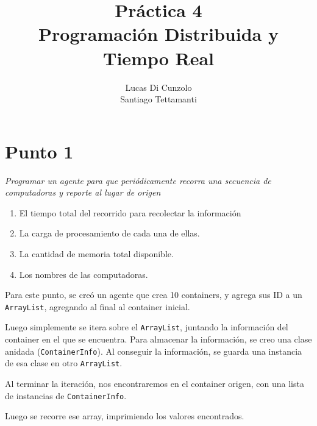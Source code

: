 \documentclass[12pt,journal,compsoc]{IEEEtran}
\begin{document}
\title{Práctica 4\\Programación Distribuida y Tiempo Real}
\author{Lucas Di Cunzolo\\Santiago Tettamanti}


\maketitle

\IEEEdisplaynontitleabstractindextext
\IEEEpeerreviewmaketitle

\section{Punto 1}

\textit{Programar un agente para que periódicamente recorra una secuencia
        de computadoras y reporte al lugar de origen}
\begin{enumerate}[label=\alph* -]
  \item El tiempo total del recorrido para recolectar la información
  \item La carga de procesamiento de cada una de ellas.
  \item La cantidad de memoria total disponible.
  \item Los nombres de las computadoras.
\end{enumerate}

Para este punto, se creó un agente que crea 10 containers, y agrega
sus ID a un \texttt{ArrayList}, agregando al final al container inicial.

Luego simplemente se itera sobre el \texttt{ArrayList}, juntando la información
del container en el que se encuentra. Para almacenar la información, se
creo una clase anidada (\texttt{ContainerInfo}). Al conseguir la información,
se guarda una instancia de esa clase en otro \texttt{ArrayList}.

Al terminar la iteración, nos encontraremos en el container origen, con
una lista de instancias de \texttt{ContainerInfo}.

Luego se recorre ese array, imprimiendo los valores encontrados.\\
\end{document}
